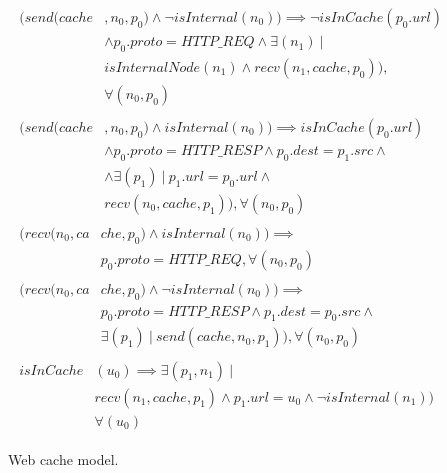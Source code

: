 \begin{figure}[h]

	{\footnotesize
		\begin{subequations}
			\begin{align}
			\begin{split}
			\label{cache_constr1}
			(send(cache&, n_{0}, p_{0}) \wedge \neg isInternal(n_{0})) \implies \neg isInCache(p_{0}.url) \\
			& \wedge p_{0}.proto = HTTP\_REQ \wedge \exists ( n_{1}) \: | \:  \\
			&  isInternalNode(n_{1}) \wedge recv(n_{1}, cache, p_{0})), \\
			& \forall (n_{0}, p_{0})
			\end{split} \\
			\begin{split}
			\label{cache_constr2}
			(send(cache&, n_{0}, p_{0}) \wedge isInternal(n_{0})) \implies isInCache(p_{0}.url) \\
			& \wedge p_{0}.proto = HTTP\_RESP \wedge p_{0}.dest = p_{1}.src \wedge \\
			& \wedge \exists  (p_{1}) \: | \:  p_{1}.url = p_{0}.url \wedge\\
			&  recv(n_{0}, cache, p_{1})), \forall (n_{0}, p_{0})			
			\end{split} \\
			\begin{split}
			\label{cache_constr4}
			(recv(n_{0},ca&che, p_{0}) \wedge isInternal(n_{0})) \implies  \\
			&  p_{0}.proto = HTTP\_REQ , \forall (n_{0}, p_{0})			
			\end{split} \\
			\begin{split}
			\label{cache_constr5}
			(recv( n_{0},ca&che, p_{0}) \wedge \neg isInternal(n_{0})) \implies \\
			&  p_{0}.proto = HTTP\_RESP \wedge p_{1}.dest = p_{0}.src \wedge \\
			& \exists  (p_{1}) \: | \: send( cache,n_{0}, p_{1})), \forall (n_{0}, p_{0})			
			\end{split} \\
			\begin{split}
			\label{cache_constr3}
			isInCache&(u_{0}) \implies \exists (p_{1}, n_{1}) \: | \:  \\
			& recv(n_{1}, cache, p_{1})  \wedge p_{1}.url = u_{0} \wedge \neg isInternal(n_{1})) \\
			& \forall (u_{0})
			\end{split}
			\end{align}
			\end{subequations}
			}%
			\caption{Web cache model.}
			\label{cache_model}
\end{figure}

